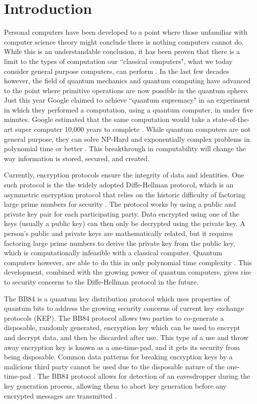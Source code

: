 \chapter{Introduction}
\label{chap:introduction}

Personal computers have been developed to a point where those unfamiliar with computer science theory might conclude there is nothing computers cannot do.
While this is an understandable conclusion, it has been proven that there is a limit to the types of computation our ``classical computers", what we today consider general purpose computers, can perform \cite{linz}.
In the last few decades however, the field of quantum mechanics and quantum computing have advanced to the point where primitive operations are now possible in the quantum sphere.
Just this year Google claimed to achieve ``quantum supremacy" in an experiment in which they performed a computation, using a quantum computer, in under five minutes. 
Google estimated that the same computation would take a state-of-the-art super computer 10,000 years to complete \cite{quantum_supremacy}. 
While quantum computers are not general purpose, they can solve NP-Hard and exponentially complex problems in polynomial time or better \cite{MikeAndIke}.
This breakthrough in computability will change the way information is stored, secured, and created.


Currently, encryption protocols ensure the integrity of data and identities.
One such protocol is the the widely adopted Diffe-Hellman protocol, which is an asymmetric encryption protocol that relies on the historic difficulty of factoring large prime numbers for security \cite{qc:agi}.
The protocol works by using a public and private key pair for each participating party.
Data encrypted using one of the keys (usually a public key) can then only be decrypted using the private key.
A person's public and private keys are mathematically related, but it requires factoring large prime numbers to derive the private key from the public key, which is computationally infeasible with a classical computer.
Quantum computers however, are able to do this in only polynomial time complexity \cite{doi:10.1137/S0036144598347011}.
This development, combined with the growing power of quantum computers, gives rise to security concerns to the Diffe-Hellman protocol in the future.

The BB84 is a quantum key distribution protocol which uses properties of quantum bits to address the growing security concerns of current key exchange protocols (KEP).
The BB84 protocol allows two parties to co-generate a disposable, randomly generated, encryption key which can be used to encrypt and decrypt data, and then be discarded after use.
This type of a use and throw away encryption key is known as a one-time-pad, and it gets its security from being disposable.
Common data patterns for breaking encryption keys by a malicious third party cannot be used due to the disposable nature of the one-time-pad \cite{cryptography}.
The BB84 protocol allows for detection of an eavesdropper during the key generation process, allowing them to abort key generation before any encrypted messages are transmitted \cite{qcftgu}.

